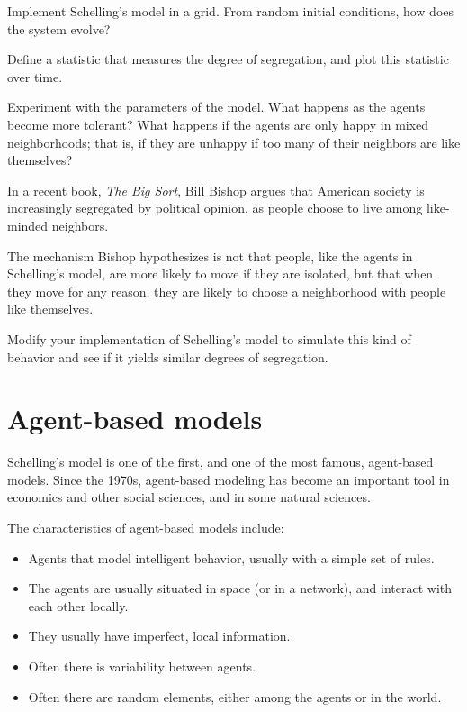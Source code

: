 \documentclass[10pt]{book}
\begin{document}
\begin{exercise}

Implement Schelling's model in a grid.  From random initial conditions,
how does the system evolve?

Define a statistic that measures the degree of segregation, and plot
this statistic over time.

Experiment with the parameters of the model.  What happens as the agents
become more tolerant?  What happens if the agents are only happy in
mixed neighborhoods; that is, if they are unhappy if too many of their
neighbors are like themselves?

\end{exercise}


\begin{exercise}

In a recent book, {\em The Big Sort}, Bill Bishop argues that
American society is increasingly segregated by political
opinion, as people choose to live among like-minded neighbors.

The mechanism Bishop hypothesizes is not that people, like the agents
in Schelling's model, are more likely to move if they are
isolated, but that when they move for any reason, they are
likely to choose a neighborhood with people like themselves.

Modify your implementation of Schelling's model to simulate
this kind of behavior and see if it yields similar degrees of
segregation.

\end{exercise}


\section{Agent-based models}

Schelling's model is one of the first, and one of the most
famous, agent-based models.  Since the 1970s, agent-based
modeling has become an important tool in economics and other
social sciences, and in some natural sciences.

The characteristics of agent-based models include:

\begin{itemize}

\item Agents that model intelligent behavior, usually with a simple
  set of rules.

\item The agents are usually situated in space (or in a network), and
  interact with each other locally.

\item They usually have imperfect, local information.

\item Often there is variability between agents.

\item Often there are random elements, either among the agents or in
  the world.

\end{itemize}
\end{document}
